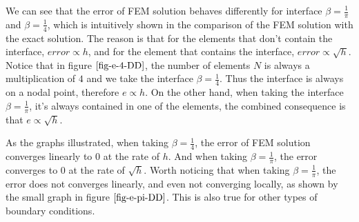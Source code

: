 \documentclass[12pt]{article}
\begin{document}
We can see that the error of FEM solution behaves differently for interface $\beta=\frac{1}{\pi}$ and $\beta=\frac{1}{4}$, which is intuitively shown in the comparison of the FEM solution with the exact solution. The reason is that for the elements that don't contain the interface, $error \propto h$, and for the element that contains the interface, $error \propto \sqrt{h}$. Notice that in figure $\ref{fig-e-4-DD}$, the number of elements $N$ is always a multiplication of $4$ and we take the interface $\beta=\frac{1}{4}$. Thus the interface is always on a nodal point, therefore $e \propto h$. On the other hand, when taking the interface $\beta=\frac{1}{\pi}$, it's always contained in one of the elements, the combined consequence is that $e \propto \sqrt{h}$.

As the graphs illustrated, when taking $\beta=\frac{1}{4}$, the error of FEM solution converges linearly to $0$ at the rate of $h$. And when taking $\beta=\frac{1}{\pi}$, the error converges to $0$ at the rate of $\sqrt{h}$. Worth noticing that when taking $\beta=\frac{1}{\pi}$, the error does not converges linearly, and even not converging locally, as shown by the small graph in figure $\ref{fig-e-pi-DD}$. This is also true for other types of boundary conditions.
\end{document}
